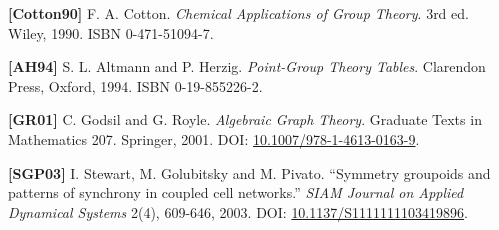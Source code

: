 \documentclass[
  11pt,
  a4paper,
]{article}
\begin{document}
\textbf{{[}Cotton90{]}} F. A. Cotton. \emph{Chemical Applications of Group Theory}. 3rd ed. Wiley, 1990. ISBN 0-471-51094-7.

\textbf{{[}AH94{]}} S. L. Altmann and P. Herzig. \emph{Point-Group Theory Tables}. Clarendon Press, Oxford, 1994. ISBN 0-19-855226-2.

\textbf{{[}GR01{]}} C. Godsil and G. Royle. \emph{Algebraic Graph Theory}. Graduate Texts in Mathematics 207. Springer, 2001. DOI: \href{https://doi.org/10.1007/978-1-4613-0163-9}{10.1007/978-1-4613-0163-9}.

\textbf{{[}SGP03{]}} I. Stewart, M. Golubitsky and M. Pivato. ``Symmetry groupoids and patterns of synchrony in coupled cell networks.'' \emph{SIAM Journal on Applied Dynamical Systems} 2(4), 609-646, 2003. DOI: \href{https://doi.org/10.1137/S1111111103419896}{10.1137/S1111111103419896}.
\end{document}
